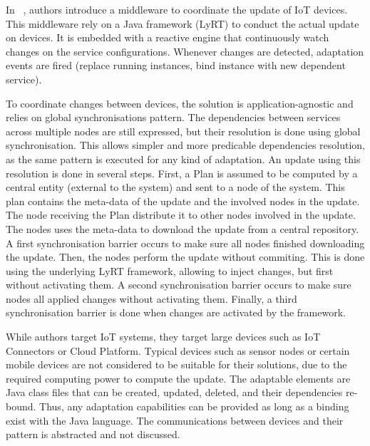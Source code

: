 \documentclass{article}
\begin{document}
In ~\cite{coordination_dsu_2016}, authors introduce a middleware to coordinate the update of IoT devices. This middleware rely on a Java framework (LyRT) to conduct the actual update on devices. It is embedded with a reactive engine that continuously watch changes on the service configurations. Whenever changes are detected, adaptation events are fired (\eg replace running instances, bind instance with new dependent service).

To coordinate changes between devices, the solution is application-agnostic and relies on global synchronisations pattern. The dependencies between services across multiple nodes are still expressed, but their resolution is done using global synchronisation. This allows simpler and more predicable dependencies resolution, as the same pattern is executed for any kind of adaptation. An update using this resolution is done in several steps. First, a Plan is assumed to be computed by a central entity (external to the system) and sent to a node of the system. This plan contains the meta-data of the update and the involved nodes in the update. The node receiving the Plan distribute it to other nodes involved in the update. The nodes uses the meta-data to download the update from a central repository. A first synchronisation barrier occurs to make sure all nodes finished downloading the update. Then, the nodes perform the update without commiting. This is done using the underlying LyRT framework, allowing to inject changes, but first without activating them. A second synchronisation barrier occurs to make sure nodes all applied changes without activating them. Finally, a third synchronisation barrier is done when changes are activated by the framework.

While authors target IoT systems, they target large devices such as IoT Connectors or Cloud Platform. Typical devices such as sensor nodes or certain mobile devices are not considered to be suitable for their solutions, due to the required computing power to compute the update. The adaptable elements are Java class files that can be created, updated, deleted, and their dependencies re-bound. Thus, any adaptation capabilities can be provided as long as a binding exist with the Java language. The communications between devices and their pattern is abstracted and not discussed.







\end{document}
